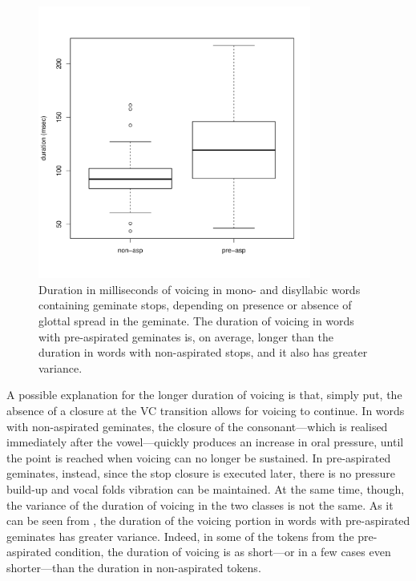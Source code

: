 \documentclass[11pt,a4paper,oneside,openany]{memoir}\usepackage[]{graphicx}\usepackage[]{color}
\newenvironment{knitrout}{}{} %
\begin{document}
\begin{figure}
\centering
\begin{knitrout}
\color{fgcolor}
\includegraphics[width=0.8\textwidth]{img/voicing-stop-1} 

\end{knitrout}
\caption[Duration in milliseconds of voicing in mono- and disyllabic words containing geminate stops.]{Duration in milliseconds of voicing in mono- and disyllabic words containing geminate stops, depending on presence or absence of glottal spread in the geminate.
The duration of voicing in words with pre-aspirated geminates is, on average, longer than the duration in words with non-aspirated stops, and it also has greater variance.
}
\label{f:voicdur}
\end{figure}

A possible explanation for the longer duration of voicing is that, simply put, the absence of a closure at the VC transition allows for voicing to continue.
In words with non-aspirated geminates, the closure of the consonant---which is realised immediately after the vowel---quickly produces an increase in oral pressure, until the point is reached when voicing can no longer be sustained.
In pre-aspirated geminates, instead, since the stop closure is executed later, there is no pressure build-up and vocal folds vibration can be maintained.
At the same time, though, the variance of the duration of voicing in the two classes is not the same.
As it can be seen from , the duration of the voicing portion in words with pre-aspirated geminates has greater variance.
Indeed, in some of the tokens from the pre-aspirated condition, the duration of voicing is as short---or in a few cases even shorter---than the duration in non-aspirated tokens.
\end{document}
